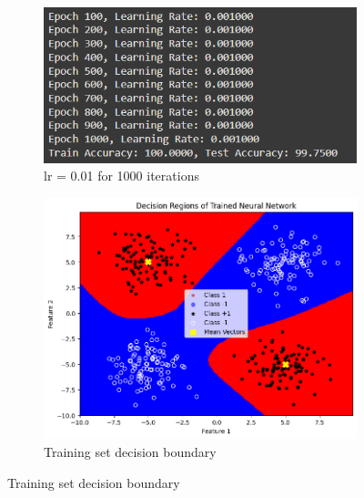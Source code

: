 \documentclass[a4paper,12pt]{article}
\begin{document}
\begin{figure}[H]
    \centering
    \captionsetup[subfigure]{list=true} %

    \begin{subfigure}{0.5\textwidth}
        \centering
        \includegraphics[width=\textwidth]{2.3_.001_1000_r.png}
        \caption{lr = 0.01 for 1000 iterations}
    \end{subfigure}
    \begin{subfigure}{0.45\textwidth}
        \centering
        \includegraphics[width=\textwidth]{2.3_.001_1000_Train.png}
        \caption{Training set decision boundary}
    \end{subfigure}


\end{figure}
\end{document}
